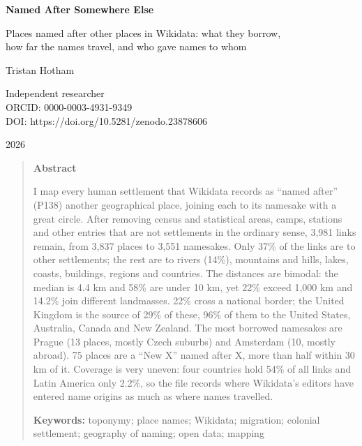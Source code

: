 \documentclass[11pt,a4paper]{article}
\begin{document}
\begin{center}
{\Large\bfseries Named After Somewhere Else\par}
\vspace{0.4em}
{\large Places named after other places in Wikidata: what they borrow,\\how far the names travel, and who gave names to whom\par}
\vspace{1.2em}
{\large Tristan Hotham\par}
\vspace{0.3em}
{\small Independent researcher\\
ORCID: 0000-0003-4931-9349\\
DOI: https://doi.org/10.5281/zenodo.23878606\par}
\vspace{0.8em}
2026
\end{center}

\begin{quote}
\small
\begin{center}\textbf{Abstract}\end{center}
I map every human settlement that Wikidata records as ``named after'' (P138) another geographical place, joining each to its namesake with a great circle. After removing census and statistical areas, camps, stations and other entries that are not settlements in the ordinary sense, 3,981 links remain, from 3,837 places to 3,551 namesakes. Only 37\% of the links are to other settlements; the rest are to rivers (14\%), mountains and hills, lakes, coasts, buildings, regions and countries. The distances are bimodal: the median is 4.4 km and 58\% are under 10 km, yet 22\% exceed 1,000 km and 14.2\% join different landmasses. 22\% cross a national border; the United Kingdom is the source of 29\% of these, 96\% of them to the United States, Australia, Canada and New Zealand. The most borrowed namesakes are Prague (13 places, mostly Czech suburbs) and Amsterdam (10, mostly abroad). 75 places are a ``New X'' named after X, more than half within 30 km of it. Coverage is very uneven: four countries hold 54\% of all links and Latin America only 2.2\%, so the file records where Wikidata's editors have entered name origins as much as where names travelled.

\textbf{Keywords:} toponymy; place names; Wikidata; migration; colonial settlement; geography of naming; open data; mapping
\end{quote}
\end{document}
